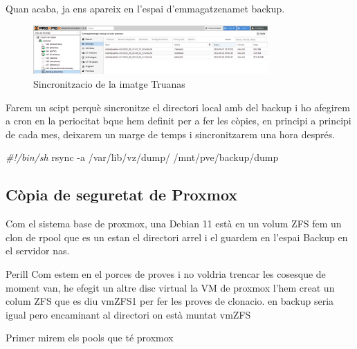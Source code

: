 \documentclass[
  10pt,
]{krantz}
\newenvironment{Shaded}{\begin{snugshade}}{\end{snugshade}}
\newcommand{\AttributeTok}[1]{\textcolor[rgb]{0.77,0.63,0.00}{#1}}
\newcommand{\CommentTok}[1]{\textcolor[rgb]{0.56,0.35,0.01}{\textit{#1}}}
\newcommand{\FunctionTok}[1]{\textcolor[rgb]{0.00,0.00,0.00}{#1}}
\newcommand{\NormalTok}[1]{#1}
\begin{document}
Quan acaba, ja ens apareix en l'espai d'emmagatzenamet backup.

\begin{figure}
\centering
\includegraphics[width=0.8\textwidth,height=\textheight]{imatges/proxmox/rsync_tue.png}
\caption{Sincronitzacio de la imatge Truanas}
\end{figure}

Farem un scipt perquè sincronitze el directori local amb del backup i ho afegirem a cron en la periocitat bque hem definit per a fer les còpies, en principi a principi de cada mes, deixarem un marge de temps i sincronitzarem una hora després.

\begin{Shaded}
\begin{Highlighting}[]
\CommentTok{\#!/bin/sh}
\FunctionTok{rsync} \AttributeTok{{-}a}\NormalTok{ /var/lib/vz/dump/ /mnt/pve/backup/dump}
\end{Highlighting}
\end{Shaded}

\hypertarget{cuxf2pia-de-seguretat-de-proxmox}{%
\subsection{Còpia de seguretat de Proxmox}\label{cuxf2pia-de-seguretat-de-proxmox}}

Com el sistema base de proxmox, una Debian 11 està en un volum ZFS fem un clon de rpool que es un estan el directori arrel i el guardem en l'espai Backup en el servidor nas.

\begin{rmdwarn}{Perill}
Com estem en el porces de proves i no voldria trencar les cosesque de moment van, he efegit un altre disc virtual la VM de proxmox l'hem creat un colum ZFS que es diu vmZFS1 per fer les proves de clonacio. en backup seria igual pero encaminant al directori on està muntat vmZFS

\end{rmdwarn}

Primer mirem els pools que té proxmox
\end{document}
